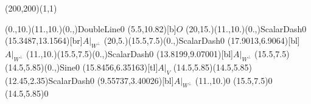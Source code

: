 \unitlength=1bp%

\begin{feynartspicture}(200,200)(1,1)

\FADiagram{}
\FAProp(0.,10.)(11.,10.)(0.,){DoubleLine}{0}
\FALabel(5.5,10.82)[b]{$O$}
\FAProp(20,15.)(11.,10.)(0.,){ScalarDash}{0}
\FALabel(15.3487,13.1564)[br]{$A|_{W^\perp}$}
\FAProp(20,5.)(15.5,7.5)(0.,){ScalarDash}{0}
\FALabel(17.9013,6.9064)[bl]{$A|_{W^\perp}$}
\FAProp(11.,10.)(15.5,7.5)(0.,){ScalarDash}{0}
\FALabel(13.8199,9.07001)[bl]{$A|_{W^\perp}$}
\FAProp(15.5,7.5)(14.5,5.85)(0.,){Sine}{0}
\FALabel(15.8456,6.35163)[tl]{$A|_V$}
\FAProp(14.5,5.85)(14.5,5.85)(12.45,2.35){ScalarDash}{0}
\FALabel(9.55737,3.40026)[bl]{$A|_{W^\perp}$}
\FAVert(11.,10.){0}
\FAVert(15.5,7.5){0}
\FAVert(14.5,5.85){0}
\end{feynartspicture}

